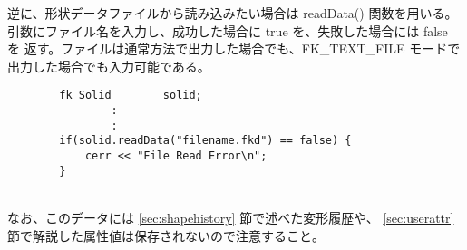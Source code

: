 逆に、形状データファイルから読み込みたい場合は readData() 関数を用いる。
引数にファイル名を入力し、成功した場合に true を、失敗した場合には false を
返す。ファイルは通常方法で出力した場合でも、FK\_TEXT\_FILE モードで
出力した場合でも入力可能である。
\\
\begin{breakbox}
\begin{verbatim}
        fk_Solid        solid;
                :
                :
        if(solid.readData("filename.fkd") == false) {
            cerr << "File Read Error\n";
        }
\end{verbatim}
\end{breakbox}
~ \\
なお、このデータには \ref{sec:shapehistory} 節で述べた変形履歴や、
\ref{sec:userattr} 節で解説した属性値は保存されないので注意すること。
